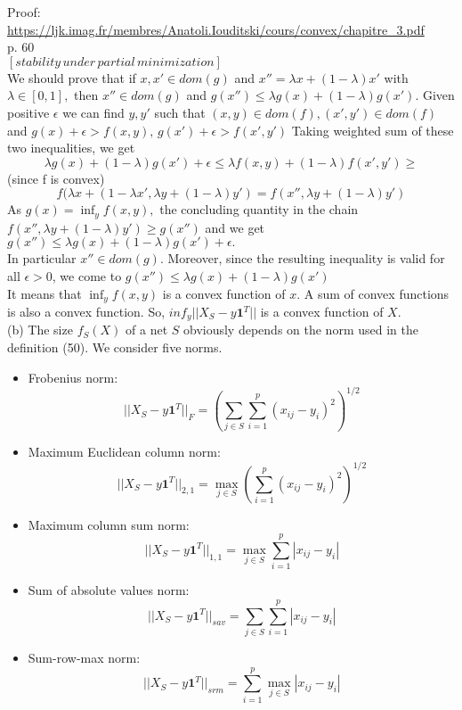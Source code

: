 \documentclass{article}
\begin{document}
Proof:\\
\url{https://ljk.imag.fr/membres/Anatoli.Iouditski/cours/convex/chapitre_3.pdf} \\
p. 60 \\
$[stability \, under \, partial \, minimization] $\\
We should prove that if $x, x' \in dom(g)$ and 
$x'' = \lambda x + (1 - \lambda) x'$ with 
$\lambda \in [0, 1],$ then $x'' \in dom(g)$ and 
$g(x'') \leq \lambda g(x) + (1 - \lambda) g(x').$
Given positive $\epsilon$ we can find $y, y'$ such that 
$(x, y) \in dom(f), (x', y') \in dom(f)$ and 
$g(x) + \epsilon > f(x, y), \, g(x') + \epsilon > f(x', y')$
Taking weighted sum of these two inequalities, we get
$$ \lambda g(x) + (1 - \lambda) g(x') + \epsilon
\leq \lambda f(x, y) + (1 - \lambda) f(x', y') \geq$$
(since f is convex)
$$f(\lambda x + (1 - \lambda x', 
\lambda y + (1 - \lambda) y')  = 
f(x'', \lambda y + (1 - \lambda) y')$$ 
As $g(x)= \inf_y f(x, y),$ the concluding quantity in the chain \\
$f(x'', \lambda y + (1 - \lambda) y') \geq g(x'')$
and we get 
$g(x'') \leq \lambda g(x) + (1 - \lambda) g(x') + \epsilon.$ \\
In particular $x'' \in dom(g).$ Moreover, since the resulting inequality is valid for all $\epsilon > 0$, we come to
$g(x'') \leq \lambda g(x) + (1 - \lambda) g(x')$
\\
It means that $\inf_y f(x, y)$ is a convex function of $x$.
A sum of convex functions is also a convex function. 
So, $inf_y ||X_S - y \boldsymbol{1}^T ||$ is a convex function of $X$.\\

(b) The size  $f_S(X)$ of a net $S$ obviously depends on the norm used in the definition (50). We consider five norms.

\begin{itemize}
	\item Frobenius norm:
	$$||X_S - y \boldsymbol{1}^T ||_F = 
	(\sum_{j \in S}\sum_{i = 1}^{p} (x_{ij} - y_i)^2)^{1/2} $$
	
	\item Maximum Euclidean column norm:
	$$||X_S - y \boldsymbol{1}^T ||_{2, 1} = 
	\max_{j \in S}(\sum_{i = 1}^{p} (x_{ij} - y_i)^2)^{1/2} $$
	
	\item Maximum column sum norm:
	$$||X_S - y \boldsymbol{1}^T ||_{1, 1} = 
	\max_{j \in S}\sum_{i = 1}^{p} |x_{ij} - y_i| $$
	
	\item Sum of absolute values norm:
	$$||X_S - y \boldsymbol{1}^T ||_{sav} = 
	\sum_{j \in S}\sum_{i = 1}^{p} |x_{ij} - y_i| $$
	
	\item Sum-row-max norm:
	$$||X_S - y \boldsymbol{1}^T ||_{srm} = 
	\sum_{i = 1}^{p} \max_{j \in S} |x_{ij} - y_i| $$
	
\end{itemize}
\end{document}
